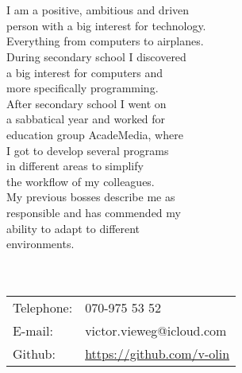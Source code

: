 \documentclass[11pt,oneside,a4paper,titlepage]{article}
\begin{document}
\begin{tcolorbox}
    \begin{minipage}[t]{8cm}
        \vspace*{-18.2pt}
        \begin{tcolorbox}[grow to left by=15pt,colframe=sup-lgray,colback=sup-lgray,sharp corners]
            {\selectfont
                \\\\
                I am a positive, ambitious and driven\\
                person with a big interest for technology.\\
                Everything from computers to airplanes.\\
                During secondary school I discovered\\
                a big interest for computers and\\
                more specifically programming.\\
                After secondary school I went on\\
                a sabbatical year and worked for\\
                education group AcadeMedia, where\\
                I got to develop several programs\\
                in different areas to simplify\\
                the workflow of my colleagues.\\
                My previous bosses describe me as\\
                responsible and has commended my\\
                ability to adapt to different\\
                environments.\\\\
                \\
                \vspace*{15pt}
                \begin{tabular}{l l}
                    \\Telephone: & 070-975 53 52 \\
                    E-mail: & victor.vieweg@icloud.com \\
                    Github: & \href{https://github.com/v-olin}{https://github.com/v-olin} \\

\end{tabular}}
\end{tcolorbox}
\end{minipage}
\end{tcolorbox}
\end{document}
